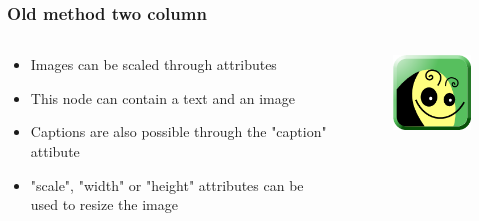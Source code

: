 \documentclass[usepdftitle=false,professionalfonts,compress ]{beamer}
\begin{document}
{
\begin{frame}\frametitle{Old method two column}
\begin{columns}
	\begin{column}{0.65\textwidth}
	\begin{itemize}

		\item Images can be scaled through attributes
		\item This node can contain a text and an image
		\item Captions are also possible through the "caption" attibute
		\item "scale", "width" or "height" attributes can be used to resize the image
	\end{itemize}
	\end{column}
\begin{column}{0.53\textwidth}

\begin{figure}
	\includegraphics[width=.97\textwidth]{freeplane-logo-2014.png}\end{figure}\end{column}
\end{columns}

\end{frame}
}
\end{document}
